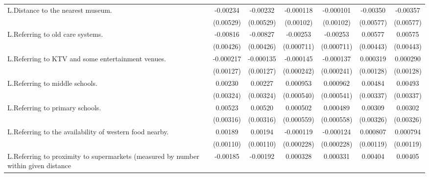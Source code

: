 {\begin{tabular}{l*{6}{c}}
\addlinespace
L.Distance to the nearest museum.&    -0.00234         &    -0.00232         &   -0.000118         &   -0.000101         &    -0.00350         &    -0.00357         \\
                    &   (0.00529)         &   (0.00529)         &   (0.00102)         &   (0.00102)         &   (0.00577)         &   (0.00577)         \\
\addlinespace
L.Referring to old care systems.&    -0.00816\sym{*}  &    -0.00827\sym{*}  &    -0.00253\sym{***}&    -0.00253\sym{***}&     0.00577         &     0.00575         \\
                    &   (0.00426)         &   (0.00426)         &  (0.000711)         &  (0.000711)         &   (0.00443)         &   (0.00443)         \\
\addlinespace
L.Referring to KTV and some entertainment venues.&   -0.000217         &   -0.000135         &   -0.000145         &   -0.000137         &    0.000319         &    0.000290         \\
                    &   (0.00127)         &   (0.00127)         &  (0.000242)         &  (0.000241)         &   (0.00128)         &   (0.00128)         \\
\addlinespace
L.Referring to middle schools.&     0.00230         &     0.00227         &    0.000953\sym{*}  &    0.000962\sym{*}  &     0.00484         &     0.00493         \\
                    &   (0.00324)         &   (0.00324)         &  (0.000540)         &  (0.000541)         &   (0.00337)         &   (0.00337)         \\
\addlinespace
L.Referring to primary schools.&     0.00523\sym{*}  &     0.00520         &    0.000502         &    0.000489         &     0.00309         &     0.00302         \\
                    &   (0.00316)         &   (0.00316)         &  (0.000559)         &  (0.000558)         &   (0.00326)         &   (0.00326)         \\
\addlinespace
L.Referring to the availability of western food nearby.&     0.00189\sym{*}  &     0.00194\sym{*}  &   -0.000119         &   -0.000124         &    0.000807         &    0.000794         \\
                    &   (0.00110)         &   (0.00110)         &  (0.000228)         &  (0.000228)         &   (0.00119)         &   (0.00119)         \\
\addlinespace
L.Referring to proximity to supermarkets (measured by number within given distance&    -0.00185         &    -0.00192         &    0.000328         &    0.000331         &     0.00404\sym{**} &     0.00405\sym{**} \\

\end{tabular}}
